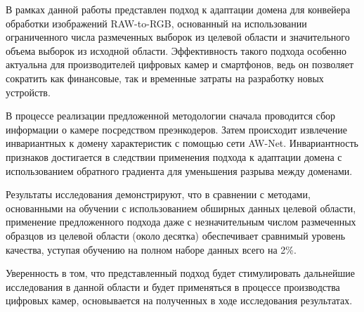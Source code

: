 
В рамках данной работы представлен подход к адаптации домена для конвейера обработки изображений RAW-to-RGB, основанный на использовании ограниченного числа размеченных выборок из целевой области и значительного объема выборок из исходной области. Эффективность такого подхода особенно актуальна для производителей цифровых камер и смартфонов, ведь он позволяет сократить как финансовые, так и временные затраты на разработку новых устройств.

В процессе реализации предложенной методологии сначала проводится сбор информации о камере посредством преэнкодеров. Затем происходит извлечение инвариантных к домену характеристик с помощью сети AW-Net. Инвариантность признаков достигается в следствии применения подхода к адаптации домена с использованием обратного градиента для уменьшения разрыва между доменами.

Результаты исследования демонстрируют, что в сравнении с методами, основанными на обучении с использованием обширных данных целевой области, применение предложенного подхода даже с незначительным числом размеченных образцов из целевой области (около десятка) обеспечивает сравнимый уровень качества, уступая обучению на полном наборе данных всего на 2\%.

Уверенность в том, что представленный подход будет стимулировать дальнейшие исследования в данной области и будет применяться в процессе производства цифровых камер, основывается на полученных в ходе исследования результатах.

\clearpage